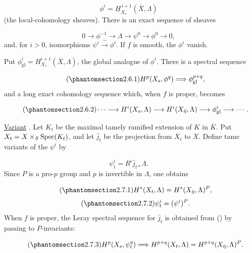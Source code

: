 \begin{equation*}
\phi^i=\underline{H}^{\,i+1}_{X_s}(\bar X,\Lambda)
\end{equation*}
(the local-cohomology sheaves). There is an exact sequence of sheaves

\begin{equation*}
0\longrightarrow\phi^{-1}\longrightarrow\Lambda\longrightarrow\psi^0
\longrightarrow\phi^0\longrightarrow0,
\end{equation*}
and, for $i>0$, isomorphisms $\psi^i\xrightarrow{\ \sim\ }\phi^i$. If $f$ is smooth, the $\phi^i$ vanish.

Put $\phi^i_{\mathrm{gl}}=H^{i+1}_{X_s}(\bar X,\Lambda)$, the global analogue of $\phi^i$. There is a spectral sequence

\begin{equation*}\tag{\SGARefTarget{sga7.sga7i.ei.n2-6-1}{2.6.1}}
H^p(X_s,\phi^q)\Longrightarrow\phi^{p+q}_{\mathrm{gl}},
\end{equation*}
and a long exact cohomology sequence which, when $f$ is proper, becomes

\begin{equation*}\tag{\SGARefTarget{sga7.sga7i.ei.n2-6-2}{2.6.2}}
\cdots\longrightarrow H^i(X_s,\Lambda)\longrightarrow H^i(X_{\bar\eta},\Lambda)
\longrightarrow\phi^i_{\mathrm{gl}}\longrightarrow\cdots.
\end{equation*}

\underline{Variant} . Let $K_t$ be the maximal tamely ramified extension of $K$ in $\bar K$. Put $X_t=X\times_S\operatorname{Spec}(K_t)$, and let $\bar j_t$ be the projection from $X_t$ to $X$. Define tame variants of the $\psi^i$ by


\begin{equation*}
\psi^i_t=R^i\bar j_{t*}\Lambda.
\end{equation*}
Since $P$ is a pro-$p$ group and $p$ is invertible in $\Lambda$, one obtains

\begin{equation}\tag{\SGARefTarget{sga7.sga7i.ei.n2-7-1}{2.7.1}}
H^*(X_t,\Lambda)=H^*(X_{\bar\eta},\Lambda)^P,
\end{equation}
\begin{equation}\tag{\SGARefTarget{sga7.sga7i.ei.n2-7-2}{2.7.2}}
\psi^i_t=(\psi^i)^P.
\end{equation}
When $f$ is proper, the Leray spectral sequence for $\bar j_t$ is obtained from () by passing to $P$-invariants:

\begin{equation}\tag{\SGARefTarget{sga7.sga7i.ei.n2-7-3}{2.7.3}}
H^p(X_s,\psi^q_t)\Longrightarrow H^{p+q}(X_t,\Lambda)
=H^{p+q}(X_{\bar\eta},\Lambda)^P.
\end{equation}
